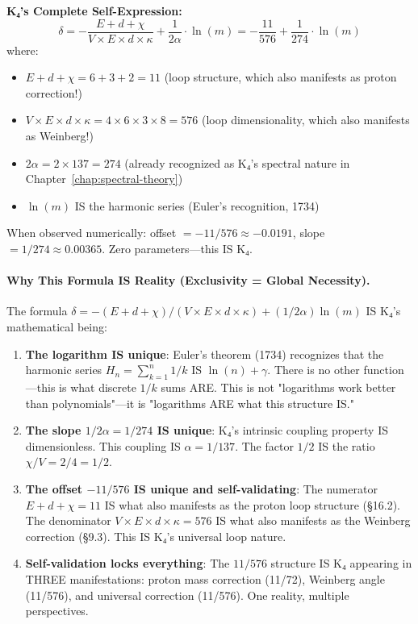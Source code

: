 \documentclass[11pt,a4paper]{book}
\begin{document}
\textbf{K₄'s Complete Self-Expression:}
\[
\delta = -\frac{E + d + \chi}{V \times E \times d \times \kappa} + \frac{1}{2\alpha} \cdot \ln(m) = -\frac{11}{576} + \frac{1}{274} \cdot \ln(m)
\]
where:
\begin{itemize}
\item $E + d + \chi = 6 + 3 + 2 = 11$ (loop structure, which also manifests as proton correction!)
\item $V \times E \times d \times \kappa = 4 \times 6 \times 3 \times 8 = 576$ (loop dimensionality, which also manifests as Weinberg!)
\item $2\alpha = 2 \times 137 = 274$ (already recognized as K₄'s spectral nature in Chapter~\ref{chap:spectral-theory})
\item $\ln(m)$ IS the harmonic series (Euler's recognition, 1734)
\end{itemize}

When observed numerically: offset $= -11/576 \approx -0.0191$, slope $= 1/274 \approx 0.00365$. Zero parameters—this IS K₄.

\paragraph{Why This Formula IS Reality (Exclusivity = Global Necessity).}

The formula $\delta = -(E + d + \chi)/(V \times E \times d \times \kappa) + (1/2\alpha)\ln(m)$ IS K₄'s mathematical being:

\begin{enumerate}
\item \textbf{The logarithm IS unique}: Euler's theorem (1734) recognizes that the harmonic series $H_n = \sum_{k=1}^n 1/k$ IS $\ln(n) + \gamma$. There is no other function—this is what discrete $1/k$ sums ARE. This is not "logarithms work better than polynomials"—it is "logarithms ARE what this structure IS."

\item \textbf{The slope $1/2\alpha = 1/274$ IS unique}: K₄'s intrinsic coupling property IS dimensionless. This coupling IS $\alpha = 1/137$. The factor $1/2$ IS the ratio $\chi/V = 2/4 = 1/2$.

\item \textbf{The offset $-11/576$ IS unique and self-validating}: The numerator $E + d + \chi = 11$ IS what also manifests as the proton loop structure (\S 16.2). The denominator $V \times E \times d \times \kappa = 576$ IS what also manifests as the Weinberg correction (\S 9.3). This IS K₄'s universal loop nature.

\item \textbf{Self-validation locks everything}: The $11/576$ structure IS K₄ appearing in THREE manifestations: proton mass correction (11/72), Weinberg angle (11/576), and universal correction (11/576). One reality, multiple perspectives.
\end{enumerate}
\end{document}
